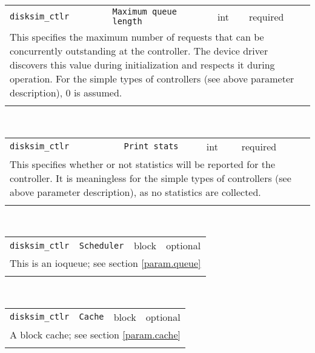 \noindent 
\begin{tabular}{|p{\lpmodwidth}|p{\lpnamewidth}|p{0.5in}|p{0.5in}|}
\cline{1-4}
\texttt{disksim\_ctlr} & \texttt{Maximum queue length} & int & required \\ 
\cline{1-4}
\multicolumn{4}{|p{6in}|}{
This specifies the maximum number of requests that can be concurrently
outstanding at the controller. The device driver discovers this value
during initialization and respects it during operation. For the
simple types of controllers (see above parameter description), 0 is
assumed.
}\\ 
\cline{1-4}
\multicolumn{4}{p{5in}}{}\\
\end{tabular}\\ 
\noindent 
\begin{tabular}{|p{\lpmodwidth}|p{\lpnamewidth}|p{0.5in}|p{0.5in}|}
\cline{1-4}
\texttt{disksim\_ctlr} & \texttt{Print stats} & int & required \\ 
\cline{1-4}
\multicolumn{4}{|p{6in}|}{
This specifies whether or not statistics will be reported for the
controller. It is meaningless for the simple types of controllers
(see above parameter description), as no statistics are collected.
}\\ 
\cline{1-4}
\multicolumn{4}{p{5in}}{}\\
\end{tabular}\\ 
\noindent 
\begin{tabular}{|p{\lpmodwidth}|p{\lpnamewidth}|p{0.5in}|p{0.5in}|}
\cline{1-4}
\texttt{disksim\_ctlr} & \texttt{Scheduler} & block & optional \\ 
\cline{1-4}
\multicolumn{4}{|p{6in}|}{
This is an ioqueue; see section \ref{param.queue}
}\\ 
\cline{1-4}
\multicolumn{4}{p{5in}}{}\\
\end{tabular}\\ 
\noindent 
\begin{tabular}{|p{\lpmodwidth}|p{\lpnamewidth}|p{0.5in}|p{0.5in}|}
\cline{1-4}
\texttt{disksim\_ctlr} & \texttt{Cache} & block & optional \\ 
\cline{1-4}
\multicolumn{4}{|p{6in}|}{
A block cache; see section \ref{param.cache}
}\\ 
\cline{1-4}
\multicolumn{4}{p{5in}}{}\\
\end{tabular}\\ 
\noindent 
